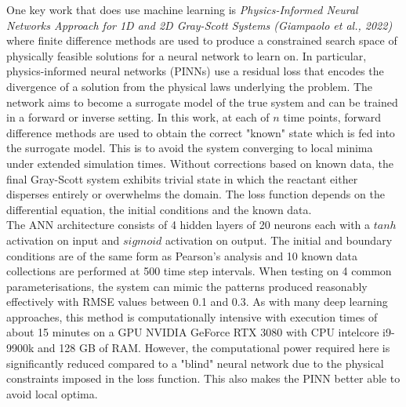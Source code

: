 One key work that does use machine learning is \textit{Physics-Informed Neural Networks Approach for 1D and 2D Gray-Scott Systems (Giampaolo et al., 2022)} where finite difference methods are used to produce a constrained search space of physically feasible solutions for a neural network to learn on. In particular, physics-informed neural networks (PINNs) use a residual loss that encodes the divergence of a solution from the physical laws underlying the problem. The network aims to become a surrogate model of the true system and can be trained in a forward or inverse setting. In this work, at each of $n$ time points, forward difference methods are used to obtain the correct "known" state which is fed into the surrogate model. This is to avoid the system converging to local minima under extended simulation times. Without corrections based on known data, the final Gray-Scott system exhibits trivial state in which the reactant either disperses entirely or overwhelms the domain. The loss function depends on the differential equation, the initial conditions and the known data.\\

The ANN architecture consists of 4 hidden layers of 20 neurons each with a $\mathit{tanh}$ activation on input and $\mathit{sigmoid}$ activation on output. The initial and boundary conditions are of the same form as Pearson's analysis and 10 known data collections are performed at 500 time step intervals. When testing on 4 common parameterisations, the system can mimic the patterns produced reasonably effectively with RMSE values between 0.1 and 0.3. As with many deep learning approaches, this method is computationally intensive with execution times of about 15 minutes on a GPU NVIDIA GeForce RTX 3080 with CPU intelcore i9-9900k and 128 GB of RAM. However, the computational power required here is significantly reduced compared to a "blind" neural network due to the physical constraints imposed in the loss function. This also makes the PINN better able to avoid local optima.

